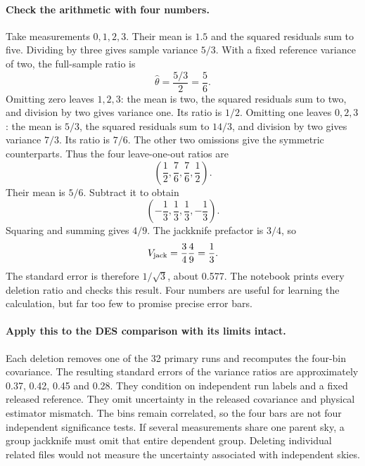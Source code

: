 \documentclass[11pt]{article}
\begin{document}
\paragraph{Check the arithmetic with four numbers.}
Take measurements $0,1,2,3$. Their mean is $1.5$ and the squared residuals
sum to five. Dividing by three gives sample variance $5/3$. With a fixed
reference variance of two, the full-sample ratio is
\begin{equation}
 \widehat\theta=\frac{5/3}{2}=\frac56.
\end{equation}
Omitting zero leaves $1,2,3$: the mean is two, the squared residuals sum to
two, and division by two gives variance one. Its ratio is $1/2$.
Omitting one leaves $0,2,3$: the mean is $5/3$, the squared residuals sum to
$14/3$, and division by two gives variance $7/3$. Its ratio is $7/6$.
The other two omissions give the symmetric counterparts. Thus the four
leave-one-out ratios are
\begin{equation}
 \left(\frac12,\frac76,\frac76,\frac12\right).
\end{equation}
Their mean is $5/6$. Subtract it to obtain
\begin{equation}
 \left(-\frac13,\frac13,\frac13,-\frac13\right).
\end{equation}
Squaring and summing gives $4/9$. The jackknife prefactor is $3/4$, so
\begin{equation}
 V_{\rm jack}=\frac34\frac49=\frac13.
\end{equation}
The standard error is therefore $1/\sqrt3$, about 0.577. The notebook prints
every deletion ratio and checks this result. Four numbers are useful for
learning the calculation, but far too few to promise precise error bars.

\paragraph{Apply this to the DES comparison with its limits intact.}
Each deletion removes one of the 32 primary runs and recomputes the
four-bin covariance. The resulting standard errors of the variance ratios
are approximately 0.37, 0.42, 0.45 and 0.28. They condition on independent
run labels and a fixed released reference. They omit uncertainty in the
released covariance and physical estimator mismatch. The bins remain
correlated, so the four bars are not four independent significance tests.
If several measurements share one parent sky, a group jackknife must omit
that entire dependent group. Deleting individual related files would not
measure the uncertainty associated with independent skies.
\end{document}
